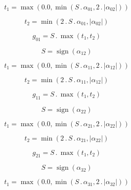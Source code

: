 \documentclass{article}
\begin{document}
\begin{dmath}t_{1} = \max\left(0.0, \min\left(S \,.\, \alpha_{01}, 2 \,.\, \left|{\alpha_{02}}\right|\right)\right)\end{dmath}

\begin{dmath}t_{2} = \min\left(2 \,.\, S \,.\, \alpha_{01}, \left|{\alpha_{02}}\right|\right)\end{dmath}

\begin{dmath}g_{01} = S \,.\, \max\left(t_{1}, t_{2}\right)\end{dmath}

\begin{dmath}S = \operatorname{sign}{\left (\alpha_{12} \right )}\end{dmath}

\begin{dmath}t_{1} = \max\left(0.0, \min\left(S \,.\, \alpha_{11}, 2 \,.\, \left|{\alpha_{12}}\right|\right)\right)\end{dmath}

\begin{dmath}t_{2} = \min\left(2 \,.\, S \,.\, \alpha_{11}, \left|{\alpha_{12}}\right|\right)\end{dmath}

\begin{dmath}g_{11} = S \,.\, \max\left(t_{1}, t_{2}\right)\end{dmath}

\begin{dmath}S = \operatorname{sign}{\left (\alpha_{22} \right )}\end{dmath}

\begin{dmath}t_{1} = \max\left(0.0, \min\left(S \,.\, \alpha_{21}, 2 \,.\, \left|{\alpha_{22}}\right|\right)\right)\end{dmath}

\begin{dmath}t_{2} = \min\left(2 \,.\, S \,.\, \alpha_{21}, \left|{\alpha_{22}}\right|\right)\end{dmath}

\begin{dmath}g_{21} = S \,.\, \max\left(t_{1}, t_{2}\right)\end{dmath}

\begin{dmath}S = \operatorname{sign}{\left (\alpha_{32} \right )}\end{dmath}

\begin{dmath}t_{1} = \max\left(0.0, \min\left(S \,.\, \alpha_{31}, 2 \,.\, \left|{\alpha_{32}}\right|\right)\right)\end{dmath}
\end{document}
